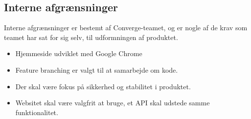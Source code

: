 \subsection{Interne afgrænsninger}

Interne afgrænsninger er bestemt af Converge-teamet, og er nogle af de krav som teamet har sat for sig selv, til udformningen af produktet.

\begin{itemize}
  \item Hjemmeside udviklet med Google Chrome
  \item Feature branching er valgt til at samarbejde om kode.
  \item Der skal være fokus på sikkerhed og stabilitet i produktet.
  \item Websitet skal være valgfrit at bruge, et API \cite[API]{converge-terms} skal udstede samme funktionalitet.
\end{itemize}